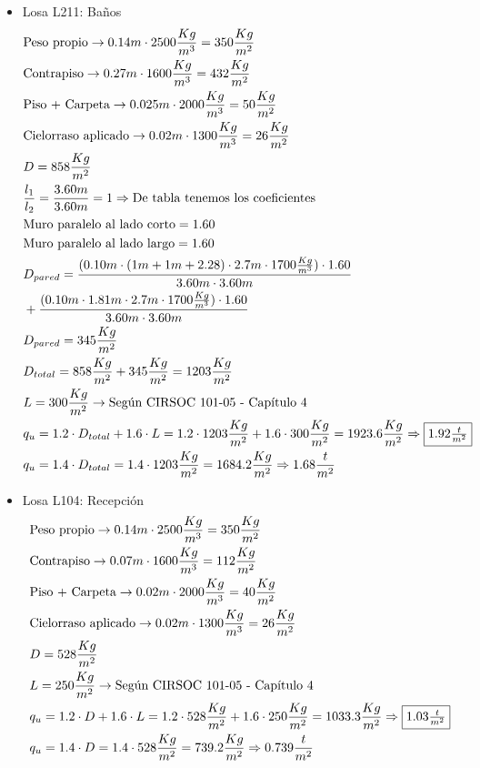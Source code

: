 \begin{enumerate}
\begin{itemize}
\item Losa L211: Baños
\begin{align*}
& \text{Peso propio} \rightarrow 0.14m \cdot 2500 \frac{Kg}{m^3} = 350 \frac{Kg}{m^2}\\
& \text{Contrapiso} \rightarrow 0.27m \cdot 1600 \frac{Kg}{m^3} = 432 \frac{Kg}{m^2}\\
& \text{Piso + Carpeta} \rightarrow 0.025m \cdot 2000 \frac{Kg}{m^3} = 50 \frac{Kg}{m^2}\\
& \text{Cielorraso aplicado} \rightarrow  0.02m \cdot 1300 \frac{Kg}{m^3} = 26 \frac{Kg}{m^2}\\
& D = 858 \frac{Kg}{m^2}\\
& \frac{l_1}{l_2} = \frac{3.60m}{3.60m} = 1 \Rightarrow \text{De tabla tenemos los coeficientes} \\
& \text{Muro paralelo al lado corto} = 1.60 \\
& \text{Muro paralelo al lado largo} = 1.60 \\
& D_{pared} = \frac{(0.10m \cdot (1m+1m+2.28) \cdot 2.7m \cdot 1700 \frac{Kg}{m^3}) \cdot 1.60}{3.60m \cdot 3.60m}\\
& + \frac{(0.10m \cdot 1.81m \cdot 2.7m \cdot 1700 \frac{Kg}{m^3}) \cdot 1.60}{3.60m \cdot 3.60m}\\
& D_{pared} = 345 \frac{Kg}{m^2} \\
& D_{total} = 858 \frac{Kg}{m^2} + 345 \frac{Kg}{m^2} = 1203 \frac{Kg}{m^2}\\
& L = 300 \frac{Kg}{m^2} \rightarrow \text{Según CIRSOC 101-05 - Capítulo 4}\\
& q_u = 1.2 \cdot D_{total} + 1.6 \cdot L = 1.2 \cdot 1203 \frac{Kg}{m^2} + 1.6 \cdot 300 \frac{Kg}{m^2} = 1923.6 \frac{Kg}{m^2} \Rightarrow \framebox{$1.92 \frac{t}{m^2}$}\\
& q_u = 1.4 \cdot D_{total} = 1.4 \cdot 1203 \frac{Kg}{m^2} = 1684.2 \frac{Kg}{m^2} \Rightarrow 1.68 \frac{t}{m^2}
\end{align*}

\item Losa L104: Recepción
\begin{align*}
& \text{Peso propio} \rightarrow 0.14m \cdot 2500 \frac{Kg}{m^3} = 350 \frac{Kg}{m^2}\\
& \text{Contrapiso} \rightarrow 0.07m \cdot 1600 \frac{Kg}{m^3} = 112 \frac{Kg}{m^2}\\
& \text{Piso + Carpeta} \rightarrow 0.02m \cdot 2000 \frac{Kg}{m^3} = 40 \frac{Kg}{m^2}\\
& \text{Cielorraso aplicado} \rightarrow  0.02m \cdot 1300 \frac{Kg}{m^3} = 26 \frac{Kg}{m^2}\\
& D = 528 \frac{Kg}{m^2}\\
& L = 250 \frac{Kg}{m^2} \rightarrow \text{Según CIRSOC 101-05 - Capítulo 4}\\
& q_u = 1.2 \cdot D + 1.6 \cdot L = 1.2 \cdot 528 \frac{Kg}{m^2} + 1.6 \cdot 250 \frac{Kg}{m^2} = 1033.3 \frac{Kg}{m^2} \Rightarrow \framebox{$1.03 \frac{t}{m^2}$} \\
& q_u = 1.4 \cdot D = 1.4 \cdot 528 \frac{Kg}{m^2} = 739.2 \frac{Kg}{m^2} \Rightarrow 0.739 \frac{t}{m^2}
\end{align*}


\end{itemize}
\end{enumerate}
